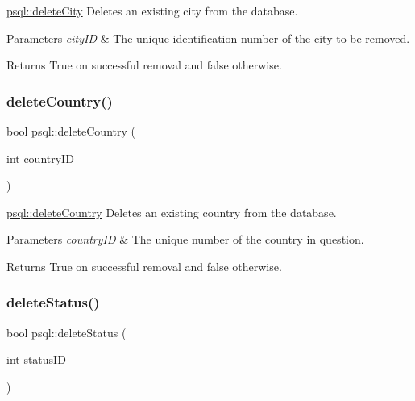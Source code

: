\hyperlink{classpsql_aaffd42b26b635d9881daaf5fbf4fd62f}{psql\+::delete\+City} Deletes an existing city from the database. 


\begin{DoxyParams}{Parameters}
{\em city\+ID} & The unique identification number of the city to be removed. \\
\hline
\end{DoxyParams}
\begin{DoxyReturn}{Returns}
True on successful removal and false otherwise. 
\end{DoxyReturn}
\mbox{\label{classpsql_a914bf8701fbed4ff80edcd0d09c7c3fd}} 
\subsubsection{\texorpdfstring{delete\+Country()}{deleteCountry()}}
{\footnotesize\ttfamily bool psql\+::delete\+Country (\begin{DoxyParamCaption}\item[{int}]{country\+ID }\end{DoxyParamCaption})}



\hyperlink{classpsql_a914bf8701fbed4ff80edcd0d09c7c3fd}{psql\+::delete\+Country} Deletes an existing country from the database. 


\begin{DoxyParams}{Parameters}
{\em country\+ID} & The unique number of the country in question. \\
\hline
\end{DoxyParams}
\begin{DoxyReturn}{Returns}
True on successful removal and false otherwise. 
\end{DoxyReturn}
\mbox{\label{classpsql_a26fc592cfb9f484e1bee62af527f2b95}} 
\subsubsection{\texorpdfstring{delete\+Status()}{deleteStatus()}}
{\footnotesize\ttfamily bool psql\+::delete\+Status (\begin{DoxyParamCaption}\item[{int}]{status\+ID }\end{DoxyParamCaption})}



